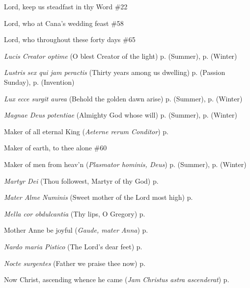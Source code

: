 \begin{hangparas}{1.25em}{1}
Lord, keep us steadfast in thy Word \dotfill \#22
\par\noindent
Lord, who at Cana's wedding feast \dotfill \#58
\par\noindent
Lord, who throughout these forty days \dotfill \#65
\par\noindent
\textit{Lucis Creator optime} (O blest Creator of the light) \dotfill p. \pageref{SundayEvensongSummer} (Summer), p. \pageref{SundayEvensongWinter} (Winter)
\par\noindent
\textit{Lustris sex qui jam peractis} (Thirty years among us dwelling) \dotfill p. \pageref{PassionSundayMattins} (Passion Sunday), p. \pageref{InventionMattins} (Invention)
\par\noindent
\textit{Lux ecce surgit aurea} (Behold the golden dawn arise) \dotfill p. \pageref{ThursdayMattinsSummer} (Summer), p. \pageref{ThursdayMattinsWinter} (Winter)
\par\noindent
\textit{Magnae Deus potentiae} (Almighty God whose will) \dotfill p. \pageref{ThursdayEvensongSummer} (Summer), p. \pageref{ThursdayEvensongWinter} (Winter)
\par\noindent
Maker of all eternal King (\textit{Aeterne rerum Conditor}) \dotfill p. \pageref{SundayMattinsWinter}
\par\noindent
Maker of earth, to thee alone \dotfill \#60
\par\noindent
Maker of men from heav'n (\textit{Plasmator hominis, Deus}) \dotfill p. \pageref{FridayEvensongSummer} (Summer), p. \pageref{FridayEvensongWinter} (Winter)
\par\noindent
\textit{Martyr Dei} (Thou followest, Martyr of thy God) \dotfill p. \pageref{StephenMattins}
\par\noindent
\textit{Mater Alme Numinis} (Sweet mother of the Lord most high) \dotfill p. \pageref{MotherhoodMattins}
\par\noindent
\textit{Mella cor obdulcantia} (Thy lips, O Gregory) \dotfill p. \pageref{GregoryMattins}
\par\noindent
Mother Anne be joyful (\textit{Gaude, mater Anna}) \dotfill p. \pageref{AnneEvensong}
\par\noindent
\textit{Nardo maria Pistico} (The Lord's dear feet) \dotfill p. \pageref{MaryMagdaleneInvitatory}
\par\noindent
\textit{Nocte surgentes} (Father we praise thee now) \dotfill p. \pageref{SundayInvitatorySummer}
\par\noindent
Now Christ, ascending whence he came (\textit{Jam Christus astra ascenderat}) \dotfill p. \pageref{WhitsundayInvitatory}

\end{hangparas}
